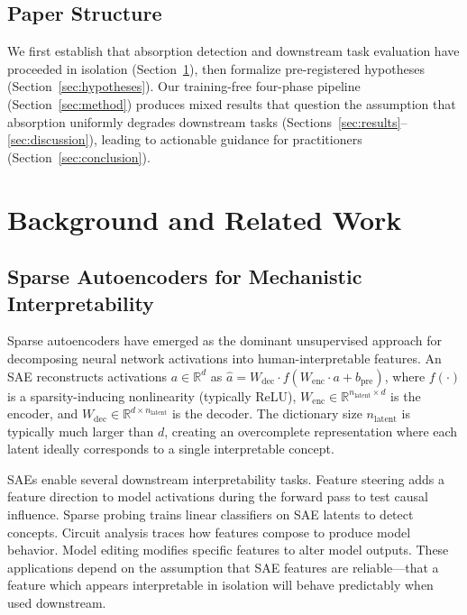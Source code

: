 \documentclass{article}
\begin{document}
\subsection{Paper Structure}

We first establish that absorption detection and downstream task evaluation have proceeded in isolation (Section~\ref{sec:background}), then formalize pre-registered hypotheses (Section~\ref{sec:hypotheses}). Our training-free four-phase pipeline (Section~\ref{sec:method}) produces mixed results that question the assumption that absorption uniformly degrades downstream tasks (Sections~\ref{sec:results}--\ref{sec:discussion}), leading to actionable guidance for practitioners (Section~\ref{sec:conclusion}).

\section{Background and Related Work}
\label{sec:background}

\subsection{Sparse Autoencoders for Mechanistic Interpretability}

Sparse autoencoders have emerged as the dominant unsupervised approach for decomposing neural network activations into human-interpretable features. An SAE reconstructs activations $a \in \mathbb{R}^d$ as $\hat{a} = W_{\text{dec}} \cdot f(W_{\text{enc}} \cdot a + b_{\text{pre}})$, where $f(\cdot)$ is a sparsity-inducing nonlinearity (typically ReLU), $W_{\text{enc}} \in \mathbb{R}^{n_{\text{latent}} \times d}$ is the encoder, and $W_{\text{dec}} \in \mathbb{R}^{d \times n_{\text{latent}}}$ is the decoder. The dictionary size $n_{\text{latent}}$ is typically much larger than $d$, creating an overcomplete representation where each latent ideally corresponds to a single interpretable concept.

SAEs enable several downstream interpretability tasks. Feature steering \citep{marks2024sparse, rimsky2024steering} adds a feature direction to model activations during the forward pass to test causal influence. Sparse probing \citep{templeton2024scaling} trains linear classifiers on SAE latents to detect concepts. Circuit analysis traces how features compose to produce model behavior. Model editing modifies specific features to alter model outputs. These applications depend on the assumption that SAE features are reliable---that a feature which appears interpretable in isolation will behave predictably when used downstream.
\end{document}
